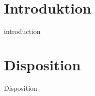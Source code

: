 \section*{Introduktion}
\begin{frame}{introduction}





\end{frame}


\section*{Disposition}
\begin{frame}{Disposition}





\end{frame}